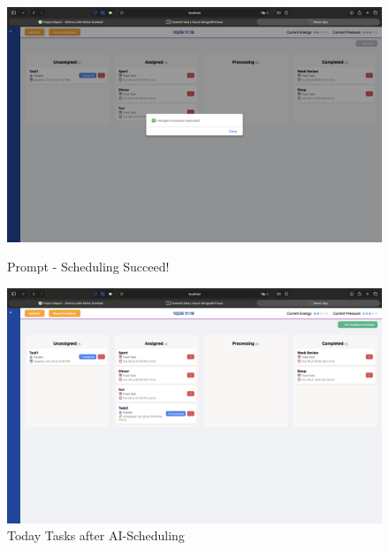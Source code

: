 \documentclass[12pt, a4paper]{article}
\begin{document}
\begin{enumerate}
                    \begin{figure}[H]
                        \begin{minipage}[t]{0.49\textwidth}
                            \centering
                            \includegraphics[width=\textwidth]{Images/System/ai_scheduling/sch_succ.png}
                            \caption{Prompt - Scheduling Succeed! }
                            \label{sch_succ}
                        \end{minipage}
                        \hfill
                        \begin{minipage}[t]{0.49\textwidth}
                            \centering
                            \includegraphics[width=\textwidth]{Images/System/ai_scheduling/aft_sch_todaytask.png}
                            \caption{Today Tasks after AI-Scheduling}
                            \label{aft_sch_todaytask}
                        \end{minipage}
                    \end{figure}


\end{enumerate}
\end{document}
